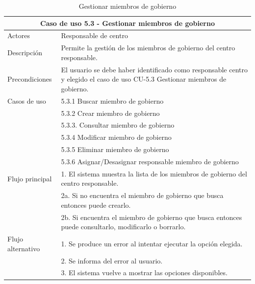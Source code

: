 \begin{table}[H]
    \caption{Gestionar miembros de gobierno}
    \label{tab:CU-5.3}
    \begin{center}
        \begin{tabular}{|l|p{12cm}|}
            \hline
            \multicolumn{2}{|c|}{Caso de uso 5.3 - Gestionar miembros de gobierno} \\
            \hline \hline
            Actores                 &   Responsable de centro          \\  
            \hline
            Descripción             &   Permite la gestión de los miembros de gobierno del centro responsable. \\  \hline
            Precondiciones          &   El usuario se debe haber identificado como responsable centro y elegido el caso de uso CU-5.3 Gestionar miembros de gobierno. \\  \hline
            Casos de uso            & 
            5.3.1 Buscar miembro de gobierno \\ 
            &
            5.3.2 Crear  miembro de gobierno \\ 
            & 
            5.3.3. Consultar miembro de gobierno\\ 
            & 
            5.3.4 Modificar miembro de gobierno \\ 
            &  
            5.3.5 Eliminar miembro de gobierno \\ 
            &
            5.3.6 Asignar/Desasignar responsable miembro de gobierno \\
            \hline
   
            Flujo principal         &   1. El sistema muestra la lista de los miembros de gobierno del centro responsable.   \\ 
            & 2a. Si no encuentra el miembro de gobierno que busca entonces puede crearlo. \\ 
            & 2b. Si encuentra el miembro de gobierno que busca entonces puede consultarlo, modificarlo o borrarlo. \\ \hline
            Flujo alternativo    &   1. Se produce un error al intentar ejecutar la opción elegida.  \\ 
            & 2. Se informa del error al usuario. \\
            & 3. El sistema vuelve a mostrar las opciones disponibles. \\
            \hline
        \end{tabular}
    \end{center}
\end{table}

